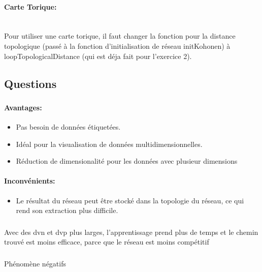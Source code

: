 \documentclass{article}
\begin{document}
\vspace{4mm}
\paragraph{Carte Torique:}\\
   Pour utiliser une carte torique, il faut changer la fonction pour la
distance topologique (passé à la fonction d'initialisation de réseau
initKohonen) à loopTopologicalDistance (qui est déja fait pour l'exercice 2).

\subsection{Questions}
\subsubsection{ }
\paragraph{Avantages:}
\begin{itemize}
   \item Pas besoin de données étiquetées.
   \item Idéal pour la visualisation de données multidimensionnelles.
   \item Réduction de dimensionalité pour les données avec plusieur
      dimensions
\end{itemize}

\paragraph{Inconvénients:}
\begin{itemize}
   \item Le résultat du réseau peut être stocké dans la topologie du 
      réseau, ce qui rend son extraction plus difficile.
\end{itemize}

\subsubsection{ }
Avec des dvn et dvp plus larges, l'apprentissage prend plus de temps
et le chemin trouvé est moins efficace, parce que le réseau est moins compétitif

\subsubsection{ }
Phénomène négatifs
\end{document}

